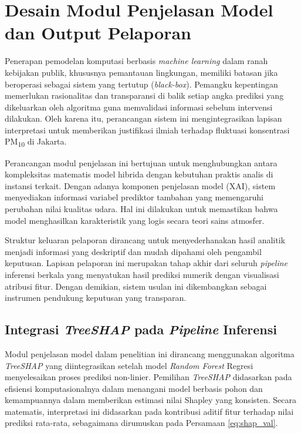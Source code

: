 \section{Desain Modul Penjelasan Model dan Output Pelaporan}

Penerapan pemodelan komputasi berbasis \textit{machine learning} dalam ranah kebijakan publik, khususnya pemantauan lingkungan, memiliki batasan jika beroperasi sebagai sistem yang tertutup (\textit{black-box}). Pemangku kepentingan memerlukan rasionalitas dan transparansi di balik setiap angka prediksi yang dikeluarkan oleh algoritma guna memvalidasi informasi sebelum intervensi dilakukan. Oleh karena itu, perancangan sistem ini mengintegrasikan lapisan interpretasi untuk memberikan justifikasi ilmiah terhadap fluktuasi konsentrasi PM\textsubscript{10} di Jakarta.

Perancangan modul penjelasan ini bertujuan untuk menghubungkan antara kompleksitas matematis model hibrida dengan kebutuhan praktis analis di instansi terkait. Dengan adanya komponen penjelasan model (XAI), sistem menyediakan informasi variabel prediktor tambahan yang memengaruhi perubahan nilai kualitas udara. Hal ini dilakukan untuk memastikan bahwa model menghasilkan karakteristik yang logis secara teori sains atmosfer.

Struktur keluaran pelaporan dirancang untuk menyederhanakan hasil analitik menjadi informasi yang deskriptif dan mudah dipahami oleh pengambil keputusan. Lapisan pelaporan ini merupakan tahap akhir dari seluruh \textit{pipeline} inferensi berkala yang menyatukan hasil prediksi numerik dengan visualisasi atribusi fitur. Dengan demikian, sistem usulan ini dikembangkan sebagai instrumen pendukung keputusan yang transparan.

\subsection{Integrasi \textit{TreeSHAP} pada \textit{Pipeline} Inferensi}

Modul penjelasan model dalam penelitian ini dirancang menggunakan algoritma \textit{TreeSHAP} yang diintegrasikan setelah model \textit{Random Forest} Regresi menyelesaikan proses prediksi non-linier. Pemilihan \textit{TreeSHAP} didasarkan pada efisiensi komputasionalnya dalam menangani model berbasis pohon dan kemampuannya dalam memberikan estimasi nilai Shapley yang konsisten. Secara matematis, interpretasi ini didasarkan pada kontribusi aditif fitur terhadap nilai prediksi rata-rata, sebagaimana dirumuskan pada Persamaan \ref{eq:shap_val}.

